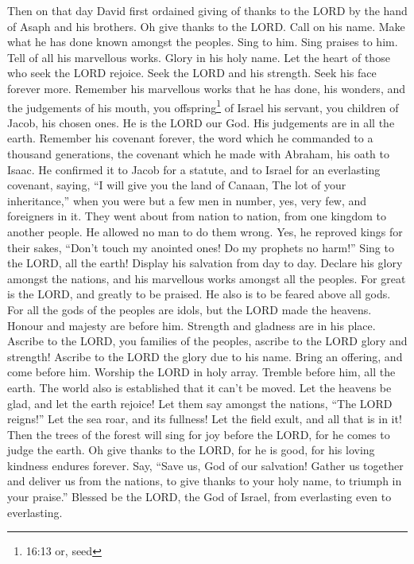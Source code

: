  Then on that day David first ordained giving of thanks to
the LORD by the hand of Asaph and his brothers.  Oh give
thanks to the LORD. Call on his name. Make what he has done known
amongst the peoples.  Sing to him. Sing praises to him. Tell
of all his marvellous works.  Glory in his holy name. Let
the heart of those who seek the LORD rejoice.  Seek the
LORD and his strength. Seek his face forever more. 
Remember his marvellous works that he has done, his wonders, and the
judgements of his mouth,  you offspring\footnote{16:13 or,
  seed} of Israel his servant, you children of Jacob, his chosen ones.
 He is the LORD our God. His judgements are in all the
earth.  Remember his covenant forever, the word which he
commanded to a thousand generations,  the covenant which he
made with Abraham, his oath to Isaac.  He confirmed it to
Jacob for a statute, and to Israel for an everlasting covenant,
 saying, ``I will give you the land of Canaan, The lot of
your inheritance,''  when you were but a few men in number,
yes, very few, and foreigners in it.  They went about from
nation to nation, from one kingdom to another people.  He
allowed no man to do them wrong. Yes, he reproved kings for their sakes,
 ``Don't touch my anointed ones! Do my prophets no harm!''
 Sing to the LORD, all the earth! Display his salvation
from day to day.  Declare his glory amongst the nations,
and his marvellous works amongst all the peoples.  For
great is the LORD, and greatly to be praised. He also is to be feared
above all gods.  For all the gods of the peoples are idols,
but the LORD made the heavens.  Honour and majesty are
before him. Strength and gladness are in his place. 
Ascribe to the LORD, you families of the peoples, ascribe to the LORD
glory and strength!  Ascribe to the LORD the glory due to
his name. Bring an offering, and come before him. Worship the LORD in
holy array.  Tremble before him, all the earth. The world
also is established that it can't be moved.  Let the
heavens be glad, and let the earth rejoice! Let them say amongst the
nations, ``The LORD reigns!''  Let the sea roar, and its
fullness! Let the field exult, and all that is in it!  Then
the trees of the forest will sing for joy before the LORD, for he comes
to judge the earth.  Oh give thanks to the LORD, for he is
good, for his loving kindness endures forever.  Say, ``Save
us, God of our salvation! Gather us together and deliver us from the
nations, to give thanks to your holy name, to triumph in your praise.''
 Blessed be the LORD, the God of Israel, from everlasting
even to everlasting.

